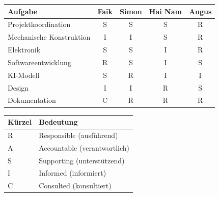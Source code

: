 \begin{tabular}{lcccc}
	
	\toprule
	
	\textbf{Aufgabe} & \textbf{Faik} & \textbf{Simon} & \textbf{Hai Nam} & \textbf{Angus} \\
	
	\midrule
	
	Projektkoordination        & S & S & S & R \\
	
	Mechanische Konstruktion   & I & I & S & R \\
	
	Elektronik                 & S & S & I & R \\
	
	Softwareentwicklung        & R & S & I & S \\
	
	KI-Modell                 & S & R & I & I \\
	
	Design                 & I & I & R & S \\
	
	
	
	Dokumentation              & C & R & R & R \\
	
	\bottomrule
	
\end{tabular}

\begin{tabular}{ll}
	
	
	\textbf{Kürzel} & \textbf{Bedeutung} \\
	
	\midrule
	
	R & Responsible (ausführend) \\
	
	A & Accountable (verantwortlich) \\
	
	S & Supporting (unterstützend) \\
	
	I & Informed (informiert) \\
	
	C & Consulted (konsultiert) \\
	\bottomrule
	
\end{tabular}